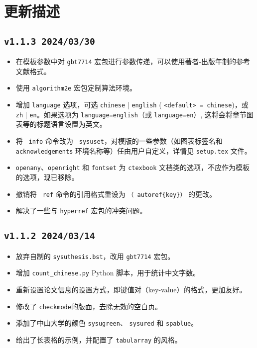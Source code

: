 \chapter{更新描述}

\section*{\texttt{v1.1.3 2024/03/30}}
\begin{itemize}
    \item 在模板参数中对 \texttt{gbt7714} 宏包进行参数传递，可以使用著者-出版年制的参考文献格式。
    \item 使用 \texttt{algorithm2e} 宏包定制算法环境。
    \item 增加 \texttt{language} 选项，可选 \texttt{chinese} | \texttt{english} ( \texttt{<default> = chinese})，或 \texttt{zh} | \texttt{en}。如果选项为 \texttt{language=english}（或 \texttt{language=en}）, 这将会将章节图表等的标题语言设置为英文。
    \item 将 \texttt{ info} 命令改为 \texttt{ sysuset}，对模版的一些参数（如图表标签名和 \\ \texttt{acknowledgements} 环境名称等）任由用户自定义，详情见 \texttt{setup.tex} 文件。
    \item \texttt{openany}、\texttt{openright} 和 \texttt{fontset} 为 \texttt{ctexbook} 文档类的选项，不应作为模板的选项，现已移除。
    \item 撤销将 \texttt{ ref} 命令的引用格式重设为 \texttt{（ autoref\{key\}）} 的更改。
    \item 解决了一些与 \texttt{hyperref} 宏包的冲突问题。
\end{itemize}

\section*{\texttt{v1.1.2 2024/03/14}}
\begin{itemize}
    \item 放弃自制的 \texttt{sysuthesis.bst}，改用 \texttt{gbt7714} 宏包。
    \item 增加  \texttt{count\_chinese.py} Python 脚本，用于统计中文字数。
    \item 重新设置论文信息的设置方式，即键值对（key-value）的格式，更加友好。
    \item 修改了 \texttt{checkmode}的版面，去除无效的空白页。
    \item 添加了中山大学的颜色 \texttt{sysugreen}、 \texttt{sysured} 和 \texttt{spablue}。
    \item 给出了长表格的示例，并配置了 \texttt{tabularray} 的风格。
\end{itemize}

